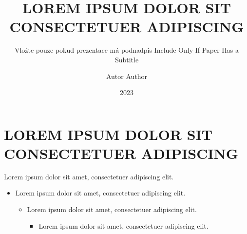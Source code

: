 \documentclass[12pt, aspectratio=169]{beamer}
\title[] %
{
	LOREM IPSUM DOLOR SIT CONSECTETUER ADIPISCING
}
\subtitle{
    \ifdef{\cslang}
        {Vložte pouze pokud prezentace má podnadpis}
        {Include Only If Paper Has a Subtitle}
}
\author[] %
{
    \ifdef{\cslang}
    {Autor}
    {Author}
}
\date[]{2023}
\begin{document}

\begin{frame}
	\maketitle
\end{frame}

\begin{frame}

\end{frame}

\section{LOREM IPSUM DOLOR SIT CONSECTETUER ADIPISCING}
\begin{frame}[t]{\secname}{Lorem ipsum dolor sit amet, consectetuer adipiscing elit.}
	\begin{itemize}
		\item Lorem ipsum dolor sit amet, consectetuer adipiscing elit.
         \begin{itemize}
             \item Lorem ipsum dolor sit amet, consectetuer adipiscing elit.
             \begin{itemize}
                \item Lorem ipsum dolor sit amet, consectetuer adipiscing elit.
             \end{itemize}
         \end{itemize}
	\end{itemize}
\end{frame}
\end{document}
